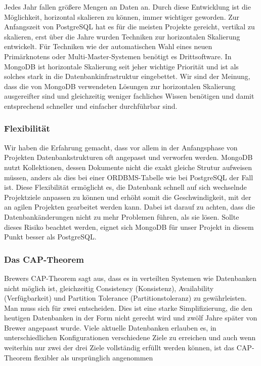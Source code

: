 Jedes Jahr fallen größere Mengen an Daten an. Durch diese Entwicklung ist die Möglichkeit, horizontal skalieren zu können, immer wichtiger geworden. Zur Anfangszeit von PostgreSQL hat es für die meisten Projekte gereicht, vertikal zu skalieren, erst über die Jahre wurden Techniken zur horizontalen Skalierung entwickelt. Für Techniken wie der automatischen Wahl eines neuen Primärknotens oder Multi-Master-Systemen benötigt es Drittsoftware. In MongoDB ist horizontale Skalierung seit jeher wichtige Priorität und ist als solches stark in die Datenbankinfrastruktur eingebettet. Wir sind der Meinung, dass die von MongoDB verwendeten Lösungen zur horizontalen Skalierung ausgereifter sind und gleichzeitig weniger fachliches Wissen benötigen und damit entsprechend schneller und einfacher durchführbar sind.

\subsubsection{Flexibilität}
Wir haben die Erfahrung gemacht, dass vor allem in der Anfangsphase von Projekten Datenbankstrukturen oft angepasst und verworfen werden. MongoDB nutzt Kollektionen, dessen Dokumente nicht die exakt gleiche Strutur aufweisen müssen, anders als dies bei einer ORDBMS-Tabelle wie bei PostgreSQL der Fall ist. Diese Flexibilität ermöglicht es, die Datenbank schnell auf sich wechselnde Projektziele anpassen zu können und erhöht somit die Geschwindigkeit, mit der an agilen Projekten gearbeitet werden kann. Dabei ist darauf zu achten, dass die Datenbankänderungen nicht zu mehr Problemen führen, als sie lösen. Sollte dieses Risiko beachtet werden, eignet sich MongoDB für unser Projekt in diesem Punkt besser als PostgreSQL.

\subsubsection{Das CAP-Theorem}
Brewers CAP-Theorem sagt aus, dass es in verteilten Systemen wie Datenbanken nicht möglich ist, gleichzeitig Consistency (Konsistenz), Availability (Verfügbarkeit) und Partition Tolerance (Partitionstoleranz) zu gewährleisten. Man muss sich für zwei entscheiden. %
Dies ist eine starke Simplifizierung, die den heutigen Datenbanken in der Form nicht gerecht wird und zwölf Jahre später von Brewer angepasst wurde. 
Viele aktuelle Datenbanken erlauben es, in unterschiedlichen Konfigurationen verschiedene Ziele zu erreichen und auch wenn weiterhin nur zwei der drei Ziele vollständig erfüllt werden können, ist das CAP-Theorem flexibler als ursprünglich angenommen

